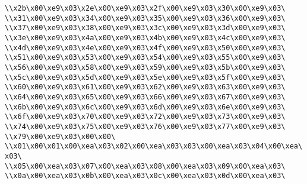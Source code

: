 \verb|\\x2b\x00\xe9\x03\x2e\x00\xe9\x03\x2f\x00\xe9\x03\x30\x00\xe9\x03\|\newline
\verb|\\x31\x00\xe9\x03\x34\x00\xe9\x03\x35\x00\xe9\x03\x36\x00\xe9\x03\|\newline
\verb|\\x37\x00\xe9\x03\x38\x00\xe9\x03\x3c\x00\xe9\x03\x3d\x00\xe9\x03\|\newline
\verb|\\x3e\x00\xe9\x03\x4a\x00\xe9\x03\x4b\x00\xe9\x03\x4c\x00\xe9\x03\|\newline
\verb|\\x4d\x00\xe9\x03\x4e\x00\xe9\x03\x4f\x00\xe9\x03\x50\x00\xe9\x03\|\newline
\verb|\\x51\x00\xe9\x03\x53\x00\xe9\x03\x54\x00\xe9\x03\x55\x00\xe9\x03\|\newline
\verb|\\x56\x00\xe9\x03\x58\x00\xe9\x03\x59\x00\xe9\x03\x5b\x00\xe9\x03\|\newline
\verb|\\x5c\x00\xe9\x03\x5d\x00\xe9\x03\x5e\x00\xe9\x03\x5f\x00\xe9\x03\|\newline
\verb|\\x60\x00\xe9\x03\x61\x00\xe9\x03\x62\x00\xe9\x03\x63\x00\xe9\x03\|\newline
\verb|\\x64\x00\xe9\x03\x65\x00\xe9\x03\x66\x00\xe9\x03\x67\x00\xe9\x03\|\newline
\verb|\\x6b\x00\xe9\x03\x6c\x00\xe9\x03\x6d\x00\xe9\x03\x6e\x00\xe9\x03\|\newline
\verb|\\x6f\x00\xe9\x03\x70\x00\xe9\x03\x72\x00\xe9\x03\x73\x00\xe9\x03\|\newline
\verb|\\x74\x00\xe9\x03\x75\x00\xe9\x03\x76\x00\xe9\x03\x77\x00\xe9\x03\|\newline
\verb|\\x79\x00\xe9\x03\x00\x00\|\newline
\verb|\\x01\x00\x01\x00\xea\x03\x02\x00\xea\x03\x03\x00\xea\x03\x04\x00\xea\x03\|\newline
\verb|\\x05\x00\xea\x03\x07\x00\xea\x03\x08\x00\xea\x03\x09\x00\xea\x03\|\newline
\verb|\\x0a\x00\xea\x03\x0b\x00\xea\x03\x0c\x00\xea\x03\x0d\x00\xea\x03\|\newline
